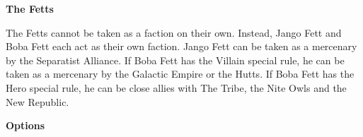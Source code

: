 \documentclass{article}
\begin{document}
\newpage

{\Large \textbf{The Fetts}}
\vspace{0.3cm}

\begin{minipage}{19cm}
    The Fetts cannot be taken as a faction on their own. Instead, Jango Fett and
    Boba Fett each act as their own faction.
    Jango Fett can be taken as a mercenary by the Separatist Alliance.
    If Boba Fett has the Villain special rule, he can be taken as a mercenary by the 
    Galactic Empire or the Hutts.
    If Boba Fett has the Hero special rule, he can be close allies with The Tribe,
    the Nite Owls and the New Republic.
\end{minipage}

\vspace{0.3cm}
{\scriptsize
\setlength\extrarowheight{1.5pt}

}
\vspace{0.6cm}

{\large \textbf{Options}}
\vspace{0.3cm}
\begin{multicols}{2}
    {\scriptsize

    \setlength\extrarowheight{1.5pt}
    

    \vspace{0.6cm}

    \setlength\extrarowheight{1.5pt}
    

    \vspace{0.6cm}

    \setlength\extrarowheight{1.5pt}
    

    \vspace{0.6cm}

    \setlength\extrarowheight{1.5pt}
    

    \vspace{0.6cm}

    }
\end{multicols}
\end{document}
